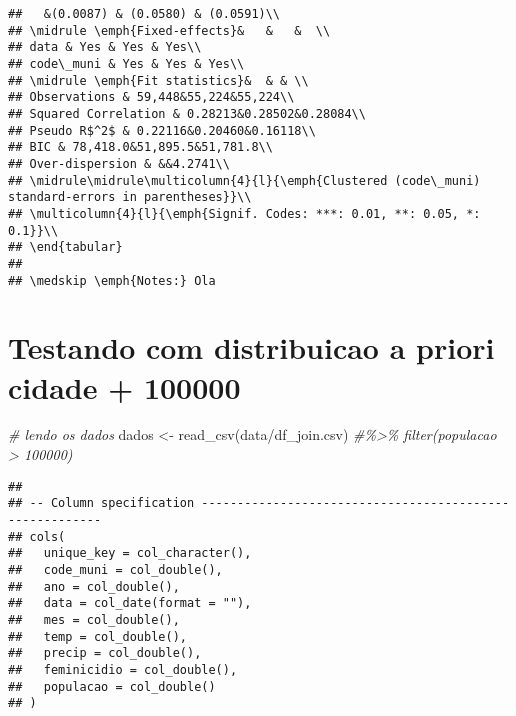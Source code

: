 \documentclass[
]{article}
\newenvironment{Shaded}{\begin{snugshade}}{\end{snugshade}}
\newcommand{\CommentTok}[1]{\textcolor[rgb]{0.56,0.35,0.01}{\textit{#1}}}
\newcommand{\FunctionTok}[1]{\textcolor[rgb]{0.00,0.00,0.00}{#1}}
\newcommand{\NormalTok}[1]{#1}
\newcommand{\OtherTok}[1]{\textcolor[rgb]{0.56,0.35,0.01}{#1}}
\newcommand{\StringTok}[1]{\textcolor[rgb]{0.31,0.60,0.02}{#1}}
\begin{document}
\begin{verbatim}
##   &(0.0087) & (0.0580) & (0.0591)\\
## \midrule \emph{Fixed-effects}&   &   &  \\
## data & Yes & Yes & Yes\\
## code\_muni & Yes & Yes & Yes\\
## \midrule \emph{Fit statistics}&  & & \\
## Observations & 59,448&55,224&55,224\\
## Squared Correlation & 0.28213&0.28502&0.28084\\
## Pseudo R$^2$ & 0.22116&0.20460&0.16118\\
## BIC & 78,418.0&51,895.5&51,781.8\\
## Over-dispersion & &&4.2741\\
## \midrule\midrule\multicolumn{4}{l}{\emph{Clustered (code\_muni) standard-errors in parentheses}}\\
## \multicolumn{4}{l}{\emph{Signif. Codes: ***: 0.01, **: 0.05, *: 0.1}}\\
## \end{tabular}
## 
## \medskip \emph{Notes:} Ola
\end{verbatim}

\hypertarget{testando-com-distribuicao-a-priori-cidade-100000}{%
\section{Testando com distribuicao a priori cidade +
100000}\label{testando-com-distribuicao-a-priori-cidade-100000}}

\begin{Shaded}
\begin{Highlighting}[]
\CommentTok{\# lendo os dados}
\NormalTok{dados }\OtherTok{\textless{}{-}} \FunctionTok{read\_csv}\NormalTok{(}\StringTok{\textquotesingle{}data/df\_join.csv\textquotesingle{}}\NormalTok{) }\CommentTok{\#\%\textgreater{}\% filter(populacao \textgreater{} 100000)}
\end{Highlighting}
\end{Shaded}

\begin{verbatim}
## 
## -- Column specification --------------------------------------------------------
## cols(
##   unique_key = col_character(),
##   code_muni = col_double(),
##   ano = col_double(),
##   data = col_date(format = ""),
##   mes = col_double(),
##   temp = col_double(),
##   precip = col_double(),
##   feminicidio = col_double(),
##   populacao = col_double()
## )
\end{verbatim}
\end{document}
